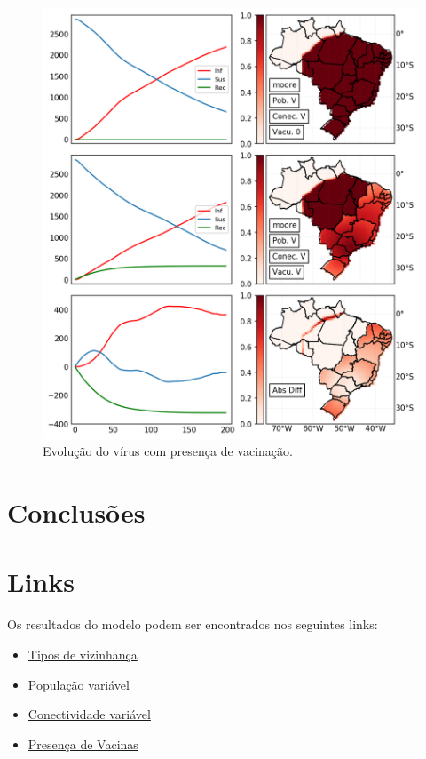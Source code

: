 \documentclass[a4paper,12pt]{article}
\begin{document}
\begin{figure}[!ht]
 \begin{center}
  \includegraphics[width=1\linewidth]{fig/Vacuna.png}
 \end{center}
 \caption{Evolução do vírus com presença de vacinação.}
\label{figure:vacun}
\end{figure}

\newpage
\section{Conclusões}

\section{Links}
Os resultados do modelo podem ser encontrados nos seguintes links:

\begin{itemize}
    \item \href{https://youtu.be/SbXQnxNSlk8}{Tipos de vizinhança}
    \item \href{https://youtu.be/70SjEVANnx0}{População variável}
    \item \href{https://youtu.be/WmcGb8urvSA}{Conectividade variável}
    \item \href{https://youtu.be/-aqAPe3ifIo}{Presença de Vacinas}
\end{itemize}


\newpage


\end{document}
